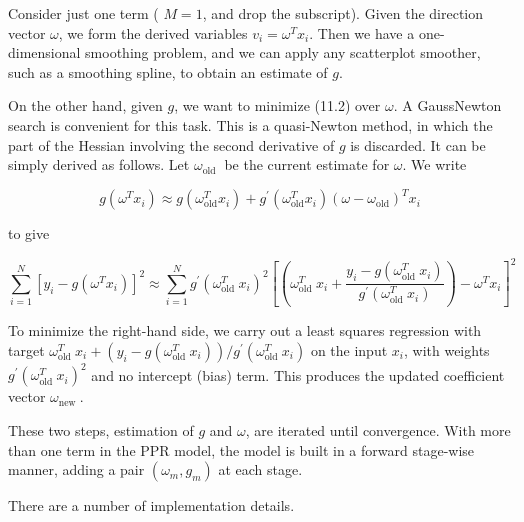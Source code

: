 \documentclass[10pt]{article}
\begin{document}
Consider just one term ( $M=1$, and drop the subscript). Given the direction vector $\omega$, we form the derived variables $v_{i}=\omega^{T} x_{i}$. Then we have a one-dimensional smoothing problem, and we can apply any scatterplot smoother, such as a smoothing spline, to obtain an estimate of $g$.

On the other hand, given $g$, we want to minimize (11.2) over $\omega$. A GaussNewton search is convenient for this task. This is a quasi-Newton method, in which the part of the Hessian involving the second derivative of $g$ is discarded. It can be simply derived as follows. Let $\omega_{\text {old }}$ be the current estimate for $\omega$. We write


\begin{equation*}
g\left(\omega^{T} x_{i}\right) \approx g\left(\omega_{\mathrm{old}}^{T} x_{i}\right)+g^{\prime}\left(\omega_{\mathrm{old}}^{T} x_{i}\right)\left(\omega-\omega_{\mathrm{old}}\right)^{T} x_{i} \tag{11.3}
\end{equation*}


to give


\begin{equation*}
\sum_{i=1}^{N}\left[y_{i}-g\left(\omega^{T} x_{i}\right)\right]^{2} \approx \sum_{i=1}^{N} g^{\prime}\left(\omega_{\text {old }}^{T} x_{i}\right)^{2}\left[\left(\omega_{\text {old }}^{T} x_{i}+\frac{y_{i}-g\left(\omega_{\text {old }}^{T} x_{i}\right)}{g^{\prime}\left(\omega_{\text {old }}^{T} x_{i}\right)}\right)-\omega^{T} x_{i}\right]^{2} \tag{11.4}
\end{equation*}


To minimize the right-hand side, we carry out a least squares regression with target $\omega_{\text {old }}^{T} x_{i}+\left(y_{i}-g\left(\omega_{\text {old }}^{T} x_{i}\right)\right) / g^{\prime}\left(\omega_{\text {old }}^{T} x_{i}\right)$ on the input $x_{i}$, with weights $g^{\prime}\left(\omega_{\text {old }}^{T} x_{i}\right)^{2}$ and no intercept (bias) term. This produces the updated coefficient vector $\omega_{\text {new }}$.

These two steps, estimation of $g$ and $\omega$, are iterated until convergence. With more than one term in the PPR model, the model is built in a forward stage-wise manner, adding a pair $\left(\omega_{m}, g_{m}\right)$ at each stage.

There are a number of implementation details.
\end{document}
